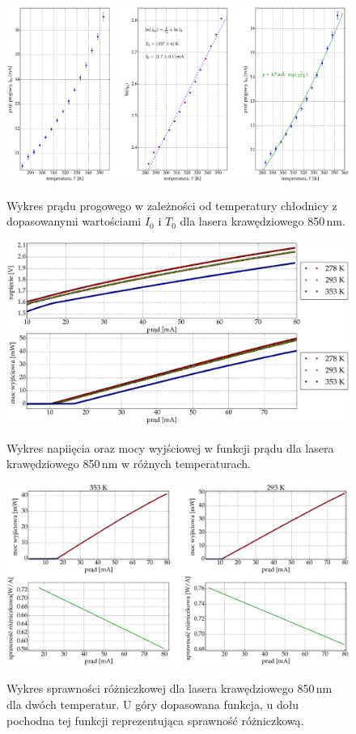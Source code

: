 \begin{figure}
\center
  \includegraphics[scale=0.30]{plot_edge_850/plot_fit.eps}
  \label{rys1}
  \caption{Wykres prądu progowego w zależności od temperatury chłodnicy z dopasowanymi wartościami $I_{0}$ i $T_{0}$ dla lasera krawędziowego 850\,nm.}
  \label{fig:plot_fit_850}
\end{figure}
\begin{figure}
\center
  \includegraphics[scale=0.30]{plot_edge_850/plot_i_v_i_l.eps}
  \label{rys1}
  \caption{Wykres napiięcia oraz mocy wyjściowej w funkcji prądu dla lasera krawędziowego 850\,nm w różnych temperaturach.}
  \label{fig:plot_i_v_i_l_850}
\end{figure}
\begin{figure}
\center
  \includegraphics[scale=0.30]{plot_edge_850/eff_via_current4.eps}
  \label{rys1}
  \caption{Wykres sprawności różniczkowej dla lasera krawędziowego 850\,nm dla dwóch temperatur. U góry dopasowana funkcja,
u dołu pochodna tej funkcji reprezentująca sprawność różniczkową.}
  \label{fig:eff_via_current4_850}
\end{figure}
